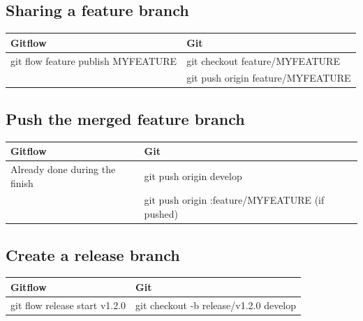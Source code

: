 \documentclass{tufte-handout}
\begin{document}
		\clearpage
		
		\subsection{Sharing a feature branch}
		
		\begin{table}[ht]
			\centering
			\selectfont
			\begin{tabular}{ll}
				\toprule
				Gitflow & Git \\
				\midrule
				git flow feature publish MYFEATURE & git checkout feature/MYFEATURE \\
				& git push origin feature/MYFEATURE \\
				\bottomrule
			\end{tabular}
			\label{tab:normaltab}
		\end{table}
		\medskip %
		
		\subsection{Push the merged feature branch}
		
		\begin{table}[ht]
			\centering
			\selectfont
			\begin{tabular}{ll}
				\toprule
				Gitflow & Git \\
				\midrule
				Already done during the finish & git push origin develop \\
				& git push origin :feature/MYFEATURE (if pushed) \\
				\bottomrule
			\end{tabular}
			\label{tab:normaltab}
		\end{table}
		\medskip %
		
		\clearpage
		
		\subsection{Create a release branch}
		
		\begin{table}[ht]
			\centering
			\selectfont
			\begin{tabular}{ll}
				\toprule
				Gitflow & Git \\
				\midrule
				git flow release start v1.2.0 & git checkout -b release/v1.2.0 develop \\
				\bottomrule
			\end{tabular}
			\label{tab:normaltab}
		\end{table}
		\medskip %
		
\end{document}
